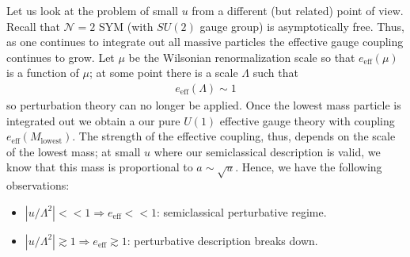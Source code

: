 \documentclass[12pt, onecolumn]{article}
\begin{document}
\noindent Let us look at the problem of small $u$ from a different (but related) point of view.  Recall that $\mathcal{N}=2$ SYM (with $SU(2)$ gauge group) is asymptotically free.  Thus, as one continues to integrate out all massive particles the effective gauge coupling continues to grow.  Let $\mu$ be the Wilsonian renormalization scale so that $e_{\text{eff}}(\mu)$ is a function of $\mu$; at some point there is a scale $\Lambda$ such that
\begin{align*}
e_{\text{eff}}(\Lambda) \sim 1
\end{align*}
so perturbation theory can no longer be applied.  Once the lowest mass particle is integrated out we obtain a our pure $U(1)$ effective gauge theory with coupling $e_{\text{eff}}(M_{\text{lowest}})$.  The strength of the effective coupling, thus, depends on the scale of the lowest mass; at small $u$ where our semiclassical description is valid, we know that this mass is proportional to $a \sim \sqrt{u}$.  Hence, we have the following observations:
\begin{itemize}
\item $|u/\Lambda^2|<<1 \Rightarrow e_{\text{eff}}<<1$: semiclassical perturbative regime.
\item $|u/\Lambda^2| \gtrsim 1 \Rightarrow e_{\text{eff}} \gtrsim 1$: perturbative description breaks down.
\end{itemize}
\end{document}
